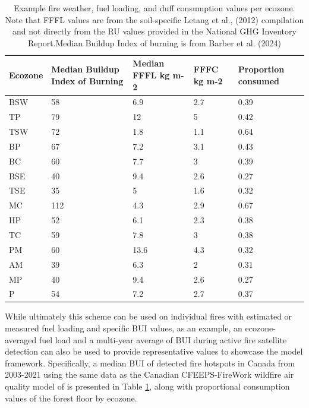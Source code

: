 \documentclass[, manuscript]{copernicus}
\begin{document}
\begin{table}
\centering
\caption{\label{tab:tab-DuffConsumpTable}Example fire weather, fuel loading, and duff consumption values per ecozone. Note that FFFL values are from the soil-specific Letang et al., (2012) compilation and not directly from the RU values provided in the National GHG Inventory Report.Median Buildup Index of burning is from Barber et al. (2024)}
\centering
\begin{tabular}[t]{l|l|l|l|l}
\hline
Ecozone & Median Buildup Index of Burning & Median FFFL kg m-2 & FFFC kg m-2 & Proportion consumed\\
\hline
BSW & 58 & 6.9 & 2.7 & 0.39\\
\hline
TP & 79 & 12 & 5 & 0.42\\
\hline
TSW & 72 & 1.8 & 1.1 & 0.64\\
\hline
BP & 67 & 7.2 & 3.1 & 0.43\\
\hline
BC & 60 & 7.7 & 3 & 0.39\\
\hline
BSE & 40 & 9.4 & 2.6 & 0.27\\
\hline
TSE & 35 & 5 & 1.6 & 0.32\\
\hline
MC & 112 & 4.3 & 2.9 & 0.67\\
\hline
HP & 52 & 6.1 & 2.3 & 0.38\\
\hline
TC & 59 & 7.8 & 3 & 0.38\\
\hline
PM & 60 & 13.6 & 4.3 & 0.32\\
\hline
AM & 39 & 6.3 & 2 & 0.31\\
\hline
MP & 40 & 9.4 & 2.6 & 0.27\\
\hline
P & 54 & 7.2 & 2.7 & 0.37\\
\hline
\end{tabular}
\end{table}

While ultimately this scheme can be used on individual fires with
estimated or measured fuel loading and specific BUI values, as an
example, an ecozone-averaged fuel load and a multi-year average of BUI
during active fire satellite detection can also be used to provide
representative values to showcase the model framework. Specifically, a
median BUI of detected fire hotspots in Canada from 2003-2021
\citep{barber2024} using the same data as the Canadian CFEEPS-FireWork
wildfire air quality model of \citep{chen2019} is presented in Table
\ref{tab:tab-DuffConsumpTable}, along with proportional consumption
values of the forest floor by ecozone.
\end{document}
